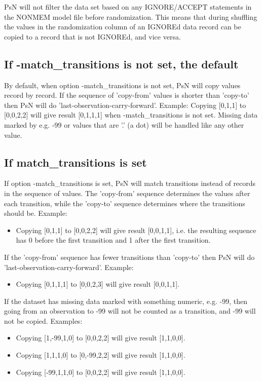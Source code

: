 PsN will not filter the data set based on any IGNORE/ACCEPT statements in the NONMEM model file before randomization. This means that
during shuffling the
values in the randomization column of an IGNOREd data record can be copied to a record that is not IGNOREd, and vice versa.

\subsection{If -match\_transitions is not set, the default}

By default, when option -match\_transitions is not set, PsN will copy values record by record. If the sequence of 'copy-from' values is shorter than 'copy-to' then PsN will do 'last-observation-carry-forward'. Example: 
Copying [0,1,1] to [0,0,2,2] will give result [0,1,1,1] when -match\_transitions is not set. Missing data marked by e.g. -99 or values that are '.' (a dot) will be handled like any other value. 

\subsection{If match\_transitions is set}

If option -match\_transitions is set, PsN will match transitions instead of records in the sequence of values. The 'copy-from' sequence determines the values after each transition, while the 'copy-to' sequence determines where the transitions should be. Example: 
\begin{itemize}
\item Copying [0,1,1] to [0,0,2,2] will give result [0,0,1,1], i.e. the resulting sequence has 0 before the first transition and 1 after the first transition. 
\end{itemize}

\noindent If the 'copy-from' sequence has fewer transitions than 'copy-to' then PsN will do 'last-observation-carry-forward'. Example:
\begin{itemize}
\item Copying [0,1,1,1] to [0,0,2,3] will give result [0,0,1,1]. 
\end{itemize}
\noindent If the dataset has missing data marked with something numeric, e.g. -99, then going from an observation to -99 will not be counted as a transition, and -99 will not be copied. Examples:
\begin{itemize}
\item Copying [1,-99,1,0] to [0,0,2,2] will give result [1,1,0,0]. 
\item Copying [1,1,1,0] to [0,-99,2,2] will give result [1,1,0,0].
\item Copying [-99,1,1,0] to [0,0,2,2] will give result [1,1,0,0]. 
\end{itemize}

